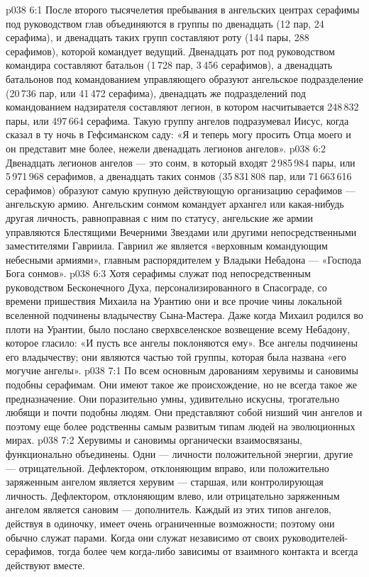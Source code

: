 \vs p038 6:1 После второго тысячелетия пребывания в ангельских центрах серафимы под руководством глав объединяются в группы по двенадцать (12 пар, 24 серафима), и двенадцать таких групп составляют роту (144 пары, 288 серафимов), которой командует ведущий. Двенадцать рот под руководством командира составляют батальон (1\,728 пар, 3\,456 серафимов), а двенадцать батальонов под командованием управляющего образуют ангельское подразделение (20\,736 пар, или 41\,472 серафима), двенадцать же подразделений под командованием надзирателя составляют легион, в котором насчитывается 248\,832 пары, или 497\,664 серафима. Такую группу ангелов подразумевал Иисус, когда сказал в ту ночь в Гефсиманском саду: «Я и теперь могу просить Отца моего и он представит мне более, нежели двенадцать легионов ангелов».
\vs p038 6:2 Двенадцать легионов ангелов --- это сонм, в который входят 2\,985\,984 пары, или 5\,971\,968 серафимов, а двенадцать таких сонмов (35\,831\,808 пар, или 71\,663\,616 серафимов) образуют самую крупную действующую организацию серафимов --- ангельскую армию. Ангельским сонмом командует архангел или какая\hyp{}нибудь другая личность, равноправная с ним по статусу, ангельские же армии управляются Блестящими Вечерними Звездами или другими непосредственными заместителями Гавриила. Гавриил же является «верховным командующим небесными армиями», главным распорядителем у Владыки Небадона --- «Господа Бога сонмов».
\vs p038 6:3 Хотя серафимы служат под непосредственным руководством Бесконечного Духа, персонализированного в Спасограде, со времени пришествия Михаила на Урантию они и все прочие чины локальной вселенной подчинены владычеству Сына\hyp{}Мастера. Даже когда Михаил родился во плоти на Урантии, было послано сверхвселенское возвещение всему Небадону, которое гласило: «И пусть все ангелы поклоняются ему». Все ангелы подчинены его владычеству; они являются частью той группы, которая была названа «его могучие ангелы».
\vs p038 7:1 По всем основным дарованиям херувимы и сановимы подобны серафимам. Они имеют такое же происхождение, но не всегда такое же предназначение. Они поразительно умны, удивительно искусны, трогательно любящи и почти подобны людям. Они представляют собой низший чин ангелов и поэтому еще более родственны самым развитым типам людей на эволюционных мирах.
\vs p038 7:2 Херувимы и сановимы органически взаимосвязаны, функционально объединены. Одни --- личности положительной энергии, другие --- отрицательной. Дефлектором, отклоняющим вправо, или положительно заряженным ангелом является херувим --- старшая, или контролирующая личность. Дефлектором, отклоняющим влево, или отрицательно заряженным ангелом является сановим --- дополнитель. Каждый из этих типов ангелов, действуя в одиночку, имеет очень ограниченные возможности; поэтому они обычно служат парами. Когда они служат независимо от своих руководителей\hyp{}серафимов, тогда более чем когда\hyp{}либо зависимы от взаимного контакта и всегда действуют вместе.
